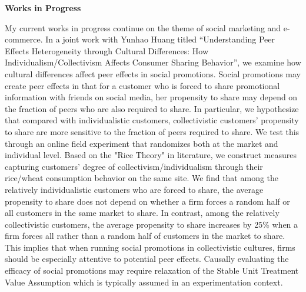 \documentclass{article}
\begin{document}
\centering
\large
\textbf{Works in Progress}\\
\normalsize
\noindent
\raggedright
My current works in progress continue on the theme of social marketing and e-commerce. In a joint work with Yunhao Huang titled “Understanding Peer Effects Heterogeneity through Cultural Differences: How Individualism/Collectivism Affects Consumer Sharing Behavior”, we examine how cultural differences affect peer effects in social promotions. Social promotions may create peer effects in that for a customer who is forced to share promotional information with friends on social media, her propensity to share may depend on the fraction of peers who are also required to share. In particular, we hypothesize that compared with individualistic customers, collectivistic customers' propensity to share are more sensitive to the fraction of peers required to share. We test this through an online field experiment that randomizes both at the market and individual level. Based on the "Rice Theory" \citep{RiceTheory} in literature, we construct measures capturing customers' degree of collectivism/individualism through their rice/wheat consumption behavior on the same site. We find that among the relatively individualistic customers who are forced to share,  the average propensity to share does not depend on whether a firm forces a random half or all customers in the same market to share. In contrast, among the relatively collectivistic customers, the average propensity to share increases by 25\% when a firm forces all rather than a random half of customers in the market to share. This implies that when running social promotions in collectivistic cultures, firms should be especially attentive to potential peer effects. Causally evaluating the efficacy of social promotions may require relaxation of the Stable Unit Treatment Value Assumption which is typically assumed in an experimentation context.
\noindent
\raggedright
\end{document}
